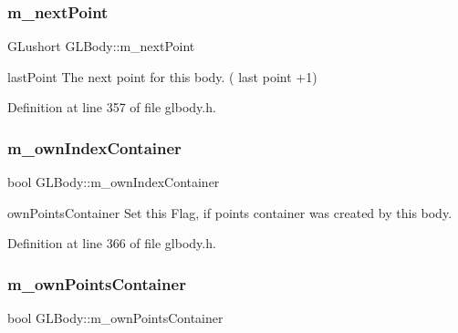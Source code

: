 \mbox{\label{class_g_l_body_ad23169cadd57fa23a035c50749974eaa}} 
\subsubsection{\texorpdfstring{m\_nextPoint}{m\_nextPoint}}
{\footnotesize\ttfamily G\+Lushort G\+L\+Body\+::m\+\_\+next\+Point\hspace{0.3cm}{\ttfamily [protected]}}



last\+Point The next point for this body. ( last point +1) 



Definition at line 357 of file glbody.\+h.

\mbox{\label{class_g_l_body_af55a5779ab18630e90686d6e3104b932}} 
\subsubsection{\texorpdfstring{m\_ownIndexContainer}{m\_ownIndexContainer}}
{\footnotesize\ttfamily bool G\+L\+Body\+::m\+\_\+own\+Index\+Container\hspace{0.3cm}{\ttfamily [protected]}}



own\+Points\+Container Set this Flag, if points container was created by this body. 



Definition at line 366 of file glbody.\+h.

\mbox{\label{class_g_l_body_afd41dccec396a5d5bc0d7deb004390c0}} 
\subsubsection{\texorpdfstring{m\_ownPointsContainer}{m\_ownPointsContainer}}
{\footnotesize\ttfamily bool G\+L\+Body\+::m\+\_\+own\+Points\+Container\hspace{0.3cm}{\ttfamily [protected]}}



